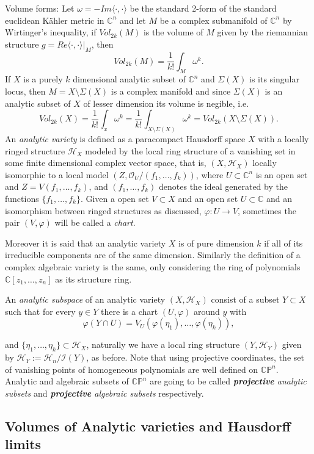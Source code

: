 \documentclass[letterpaper]{book}
\newcommand{\co}{\ensuremath{\mathbb C }}
\newcommand{\con}{\ensuremath{\mathbb{C}^n}}
\newcommand{\cp}{\ensuremath{\mathbb{CP}}}
\begin{document}
Volume forms: Let $\omega=-Im\langle\cdot,\cdot\rangle$ be the standard 2-form of the standard euclidean Kähler metric in $\con$ and let $M$ be a complex submanifold of $\con$ by Wirtinger's inequality, if $Vol_{2k}(M)$ is the volume of $M$ given by the riemannian structure $g=Re\langle\cdot,\cdot\rangle\vert_{M}$, then
\begin{equation}
        Vol_{2k}(M)= \frac{1}{k!}\int_M \omega^k.
\end{equation}
If $X$ is a purely $k$ dimensional analytic subset of $\con$ and $\Sigma(X)$ is
its singular locus, then $M=X\setminus\Sigma(X)$ is a complex manifold and
since $\Sigma(X)$ is an analytic subset of $X$ of lesser dimension its volume is negible, i.e.
\[
    Vol_{2k}(X)= \frac{1}{k!}\int_{x} \omega^k=
                              \frac{1}{k!}\int_{X\setminus\Sigma(X)} \omega^k=
                                                            Vol_{2k}(X\setminus\Sigma(X)).
\]
An \emph{analytic variety} is defined as a paracompact Hausdorff space $X$ with a locally ringed structure $\mathcal{H}_{X}$ modeled by the local ring structure of
a vanishing set in some finite dimensional complex vector space, that is, $(X,\mathcal{H}_{X})$ locally isomorphic to a local model $(Z,\mathcal{O}_{U}/(f_{1},\dots,f_{k}))$, where $U\subset\con$ is an open set and $Z=V(f_{1},\dots,f_{k})$, and $(f_{1},\dots,f_{k})$ denotes the ideal generated by the functions $\{f_{1},\dots,f_{k}\}$. Given a open set $V\subset X$ and an open set $U\subset\co$ and an isomorphism between ringed structures as discussed, $\varphi:U\rightarrow V$, sometimes the pair $(V,\varphi)$ will be called a \emph{chart}.

Moreover it is said that an analytic variety $X$ is of pure dimension $k$ if all of its irreducible components are of the same dimension. Similarly the definition of a complex algebraic variety is the same, only considering the ring of polynomials $\co[z_{1},\dots,z_{n}]$ as its structure ring.

An \emph{analytic subspace} of an analytic variety $(X,\mathcal{H}_{X})$ consist of a subset $Y\subset X$ such that for every $y\in Y$ there is a chart $(U,\varphi)$ around $y$ with
\[
  \varphi(Y\cap U)=V_U(\varphi(\eta_1),\dots,\varphi(\eta_k)),
\]

\noindent and $\lbrace\eta_1,\dots,\eta_k\rbrace\subset\mathcal{H}_{X}$, naturally we have a local ring structure $(Y,\mathcal{H}_{Y})$ given by $\mathcal{H}_Y:=\mathcal{H}_n/\mathcal{I}(Y)$, as before.
Note that using projective coordinates, the set of vanishing points of homogeneous polynomials are well defined on $\cp^n$. Analytic and algebraic subsets of $\cp^n$ are going to be called  \emph{\textbf{projective} analytic subsets} and \emph{\textbf{projective} algebraic subsets} respectively.
\subsection{Volumes of Analytic varieties and Hausdorff limits}
\end{document}
